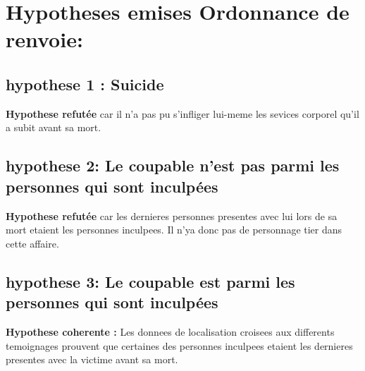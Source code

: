 \documentclass[11pt,a4paper]{book}
\begin{document}
\chapter{Hypotheses emises Ordonnance de renvoie: }

\section{hypothese 1 : Suicide}

\textbf{Hypothese refutée} car il n'a pas pu s'infliger lui-meme les sevices corporel qu'il a subit avant sa mort.

\section{hypothese 2: Le coupable n'est pas parmi les personnes qui sont inculpées}

\textbf{Hypothese refutée} car les dernieres personnes presentes avec lui lors de sa mort etaient les personnes inculpees. Il n'ya donc pas de personnage tier dans cette affaire.

\section{hypothese 3: Le coupable est parmi les personnes qui sont inculpées}

\textbf{Hypothese coherente :} Les donnees de localisation croisees aux differents temoignages prouvent que certaines des personnes inculpees etaient les dernieres presentes avec la victime avant sa mort.
\end{document}
